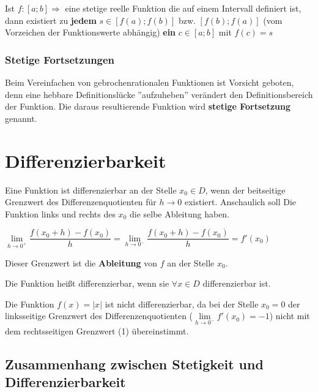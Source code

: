 \documentclass[main.tex]{subfiles}
\begin{document}
\begin{Theorem}[Zwischenwertsatz]
	Ist $f:[a;b]\Rightarrow$ eine stetige reelle Funktion die auf einem Intervall definiert ist, dann existiert zu \textbf{jedem} $s \in [f(a);f(b)]$ bzw. $[f(b);f(a)]$ (vom Vorzeichen der Funktionswerte abhängig) \textbf{ein} $c \in [a;b] $ mit $f(c)=s$
\end{Theorem}


\subsubsection{Stetige Fortsetzungen}

Beim Vereinfachen von gebrochenrationalen Funktionen ist Vorsicht geboten, denn eine hebbare Definitionslücke ''aufzuheben'' verändert den Definitionsbereich der Funktion. Die daraus resultierende Funktion wird \textbf{stetige Fortsetzung} genannt.



\section{Differenzierbarkeit}

\begin{Definition}
	Eine Funktion ist differenzierbar an der Stelle $x_{0} \in D$, wenn der beitseitige Grenzwert des Differenzenquotienten für $h\rightarrow 0$ existiert. Anschaulich soll Die Funktion links und rechts des $x_{0}$ die selbe Ableitung haben.

	$\lim\limits_{h \rightarrow 0^{+}} {\dfrac{f(x_{0}+h)-f(x_{0})}{h}} = \lim\limits_{h \rightarrow 0^{-}} {\dfrac{f(x_{0}+h)-f(x_{0})}{h}} =f'(x_{0})$

	Dieser Grenzwert ist die \textbf{Ableitung} von $f$ an der Stelle $x_{0}$.

	Die Funktion heißt differenzierbar, wenn sie $\forall x \in D$ differenzierbar ist.
\end{Definition}


Die Funktion $f(x)=|x|$ ist nicht differenzierbar, da bei der Stelle $x_{0}=0$ der linksseitige Grenzwert des Differenzenquotienten ($\lim\limits_{h \rightarrow 0^{-}}{f'(x_{0})=-1}$) nicht mit dem rechtsseitigen Grenzwert (1) übereinstimmt.


\subsection{Zusammenhang zwischen Stetigkeit und Differenzierbarkeit}
\end{document}
